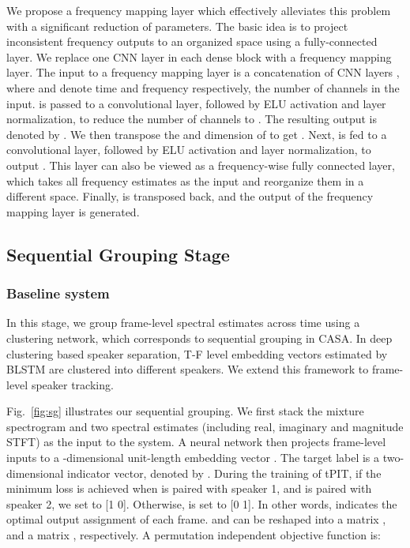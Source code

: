 \documentclass[journal]{IEEEtran}
\begin{document}
We propose a frequency mapping layer which effectively alleviates this problem with a significant reduction of parameters.
The basic idea is to project inconsistent frequency outputs to an organized space using a fully-connected layer. 
We replace one CNN layer in each dense block with a frequency mapping layer.
The input to a frequency mapping layer is a concatenation of CNN layers , where  and  denote time and frequency respectively,  the number of channels in the input.
 is passed to a  convolutional layer, followed by ELU activation and layer normalization, to reduce the number of channels to . 
The resulting output is denoted by . 
We then transpose the  and  dimension of  to get .
Next,  is fed to a  convolutional layer, followed by ELU activation and layer normalization, to output . This layer can also be viewed as a frequency-wise fully connected layer, which takes all frequency estimates as the input and reorganize them in a different space.
Finally,  is transposed back, and the output of the frequency mapping layer  is generated.




\subsection{Sequential Grouping Stage}
\label{sec:4.2}
\subsubsection{Baseline system}
\label{sec:4.2.1}
In this stage, we group frame-level spectral estimates across time using a clustering network, which corresponds to sequential grouping in CASA.
In deep clustering based speaker separation, T-F level embedding vectors estimated by BLSTM are clustered into different speakers.
We extend this framework to frame-level speaker tracking.

Fig.~\ref{fig:sg} illustrates our sequential grouping. 
We first stack the mixture spectrogram and two spectral estimates (including real, imaginary and magnitude STFT) as the input to the system.
A neural network then projects frame-level inputs to a -dimensional unit-length embedding vector .
The target label is a two-dimensional indicator vector, denoted by . 
During the training of tPIT, if the minimum loss is achieved when  is paired with speaker 1, and  is paired with speaker 2, we set  to [1 0]. 
Otherwise,  is set to [0 1].
In other words,  indicates the optimal output assignment of each frame.
 and  can be reshaped into a  matrix , and a  matrix , respectively.
A permutation independent objective function \cite{DC} is:
\end{document}
